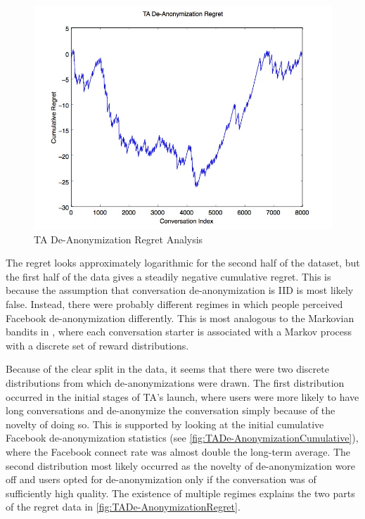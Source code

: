 \begin{figure}[H]
\centering
\includegraphics[trim= 0mm 0mm 0mm 0mm, clip, scale=0.5]{./Figures/TADe-AnonymizationRegret.jpg}
\caption{TA De-Anonymization Regret Analysis}
\label{fig:TADe-AnonymizationRegret}
\end{figure}

The regret looks approximately logarithmic for the second half of the dataset, but the first half of the data gives a steadily negative cumulative regret. This is because the assumption that conversation de-anonymization is IID is most likely false. Instead, there were probably different regimes in which people perceived Facebook de-anonymization differently. This is most analogous to the Markovian bandits in \cite{bubeck12}, where each conversation starter is associated with a Markov process with a discrete set of reward distributions.

Because of the clear split in the data, it seems that there were two discrete distributions from which de-anonymizations were drawn. The first distribution occurred in the initial stages of TA's launch, where users were more likely to have long conversations and de-anonymize the conversation simply because of the novelty of doing so. This is supported by looking at the initial cumulative Facebook de-anonymization statistics (see \autoref{fig:TADe-AnonymizationCumulative}), where the Facebook connect rate was almost double the long-term average. The second distribution most likely occurred as the novelty of de-anonymization wore off and users opted for de-anonymization only if the conversation was of sufficiently high quality. The existence of multiple regimes explains the two parts of the regret data in \autoref{fig:TADe-AnonymizationRegret}.

